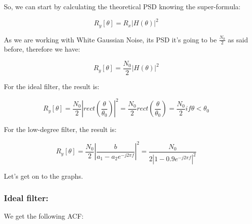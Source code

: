 \documentclass[a4paper,11pt]{article}
\begin{document}
So, we can start by calculating the theoretical PSD knowing the super-formula:

\begin{equation}R_y[\theta] = R_x|H(\theta)|^2\end{equation}

As we are working with White Gaussian Noise, its PSD it's going to be $\frac{N_0}{2}$ as said before, therefore we have:

\begin{equation}R_y[\theta] = \frac{N_0}{2}|H(\theta)|^2\end{equation}

For the ideal filter, the result is:

\begin{equation}R_y[\theta] = \frac{N_0}{2}|rect(\frac{\theta}{\theta_0})|^2 = \frac{N_0}{2}rect(\frac{\theta}{\theta_0}) = \frac{N_0}{2} if \theta < \theta_0 \end{equation}

For the low-degree filter, the result is:

\begin{equation}R_y[\theta] = \frac{N_0}{2}|\frac{b}{a_1-a_2e^{-j2 \pi f}}|^2 = \frac{N_0}{2|1-0.9e^{-j2 \pi f}|^2} \end{equation}

Let's get on to the graphs.

\newpage

\subsubsection{Ideal filter:}

We get the following ACF:
\end{document}
